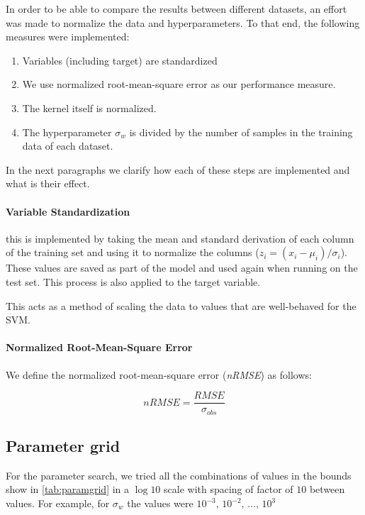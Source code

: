 In order to be able to compare the results between different datasets, an effort
was made to normalize the data and hyperparameters. To that end, the following
measures were implemented:

\begin{enumerate}
    \item Variables (including target) are standardized
    \item We use normalized root-mean-square error as our performance
          measure.
    \item The kernel itself is normalized.
    \item The hyperparameter $\sigma_w$ is divided by the number of samples in
          the training data of each dataset.
\end{enumerate}

In the next paragraphs we clarify how each of these steps are implemented and
what is their effect.

\paragraph{Variable Standardization} this is implemented by taking the mean and
standard derivation of each column of the training set and using it to normalize
the columns ($z_i = (x_i - \mu_i)/\sigma_i$). These values are saved as part of
the model and used again when running on the test set. This process is also
applied to the target variable.

This acts as a method of scaling the data to values that are well-behaved for
the SVM.

\paragraph{Normalized Root-Mean-Square Error} We define the
normalized root-mean-square error (\emph{nRMSE}) as follows:

\begin{equation}
    nRMSE = \frac{RMSE}{\sigma_{obs}}
\end{equation}

\subsection{Parameter grid}

For the parameter search, we tried all the combinations of values in the bounds
show in \cref{tab:paramgrid} in a $\log 10$ scale with spacing of factor of $10$
between values. For example, for $\sigma_w$ the values were
$10^{-3},\,10^{-2},\,\dots,\,10^{3}$

